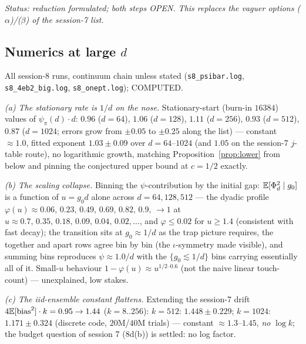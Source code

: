 \emph{Status: reduction formulated; both steps OPEN.  This replaces
the vaguer options ($\alpha$)/($\beta$) of the session-7 list.}

\subsection{Numerics at large $d$}\label{sec:mixnum}

All session-8 runs, continuum chain unless stated
(\texttt{s8\_psibar.log}, \texttt{s8\_4eb2\_big.log},
\texttt{s8\_onept.log}); COMPUTED.

\emph{(a) The stationary rate is $1/d$ on the nose.}  Stationary-start
(burn-in $16384$) values of $\psi_\pi(d)\cdot d$:
$0.96$ ($d{=}64$), $1.06$ ($d{=}128$), $1.11$ ($d{=}256$),
$0.93$ ($d{=}512$), $0.87$ ($d{=}1024$; errors grow from $\pm0.05$
to $\pm0.25$ along the list) --- constant $\approx1.0$, fitted
exponent $1.03\pm0.09$ over $d=64$--$1024$ (and $1.05$ on the
session-7 $j$-table route), no logarithmic growth, matching
Proposition~\ref{prop:lower} from below and pinning the conjectured
upper bound at $c=1/2$ exactly.

\emph{(b) The scaling collapse.}  Binning the $\psi$-contribution by
the initial gap: $\mathbb{E}[\Phi_d^2\mid g_0]$ is a function of $u=g_0d$
alone across $d=64,128,512$ --- the dyadic profile
$\varphi(u)\approx0.06,\,0.23,\,0.49,\,0.69,\,0.82,\,0.9,\,{\to}1$ at
$u\approx0.7,\,0.35,\,0.18,\,0.09,\,0.04,\,0.02,\dots$, and
$\varphi\le0.02$ for $u\ge1.4$ (consistent with fast decay); the
transition sits at $g_0\approx1/d$ as the trap picture requires, the
together and apart rows agree bin by bin (the $\iota$-symmetry made
visible), and summing bins reproduces $\psi\approx1.0/d$ with the
$\{g_0\lesssim1/d\}$ bins carrying essentially all of it.  Small-$u$
behaviour $1-\varphi(u)\approx u^{1/2\text{--}0.6}$ (not the naive
linear touch-count) --- unexplained, low stakes.

\emph{(c) The iid-ensemble constant flattens.}  Extending the
session-7 drift $4\mathbb{E}[\mathrm{bias}^2]\cdot k=0.95\to1.44$
($k=8..256$): $k=512$: $1.448\pm0.229$; $k=1024$: $1.171\pm0.324$
(discrete code, $20$M/$40$M trials) --- constant $\approx1.3$--$1.45$,
\emph{no} $\log k$; the budget question of session 7 (8d(b)) is
settled: no log factor.

